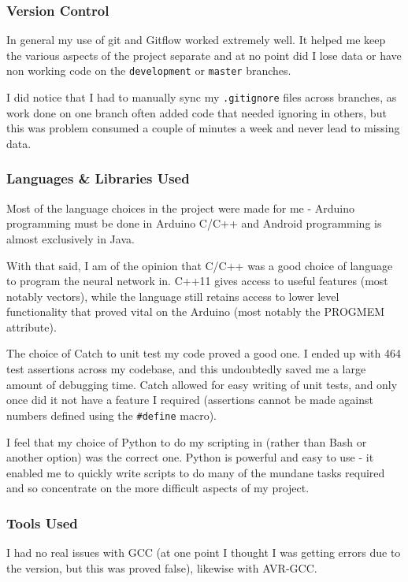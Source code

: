 \documentclass[a4paper]{article}
\begin{document}
\subsubsection{Version Control}

In general my use of git and Gitflow worked extremely well. It helped me keep the various aspects of the project separate and at no point did I lose data or have non working code on the \lstinline{development} or \lstinline{master} branches. 

I did notice that I had to manually sync my \lstinline{.gitignore} files across branches, as work done on one branch often added code that needed ignoring in others, but this was problem consumed a couple of minutes a week and never lead to missing data.

\subsubsection{Languages \& Libraries Used}

Most of the language choices in the project were made for me - Arduino programming must be done in Arduino C/C++ and Android programming is almost exclusively in Java. 

With that said, I am of the opinion that C/C++ was a good choice of language to program the neural network in. C++11 gives access to useful features (most notably vectors), while the language still retains access to lower level functionality that proved vital on the Arduino (most notably the PROGMEM attribute).

The choice of Catch to unit test my code proved a good one. I ended up with 464 test assertions across my codebase, and this undoubtedly saved me a large amount of debugging time. Catch allowed for easy writing of unit tests, and only once did it not have a feature I required (assertions cannot be made against numbers defined using the \lstinline{#define} macro).

I feel that my choice of Python to do my scripting in (rather than Bash or another option) was the correct one. Python is powerful and easy to use - it enabled me to quickly write scripts to do many of the mundane tasks required and so concentrate on the more difficult aspects of my project. 

\subsubsection{Tools Used}

I had no real issues with GCC (at one point I thought I was getting errors due to the version, but this was proved false), likewise with AVR-GCC.
\end{document}
